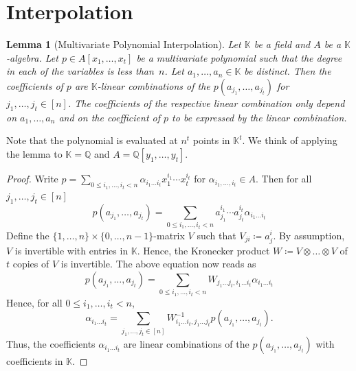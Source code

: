 \documentclass[11pt, DIV=15]{scrarticle}
\theoremstyle{definition}
\theoremstyle{plain}
\newtheorem{lemma}[definition]{Lemma}
\theoremstyle{remark}
\begin{document}
	
	
	\section{Interpolation}
	
	\begin{lemma}[Multivariate Polynomial Interpolation] \label{lem:multivariate-polynomial-interpolation}
		Let $\mathbb{K}$ be a field and $A$ be a $\mathbb{K}$-algebra.
		Let $p \in A[x_1, \dots, x_t]$ be a multivariate polynomial such that the degree in each of the variables is less than~$n$.
		Let $a_1, \dots, a_n \in \mathbb{K}$ be distinct.
		Then the coefficients of $p$ are $\mathbb{K}$-linear combinations of the $p(a_{j_1}, \dots, a_{j_t})$ for $j_1, \dots, j_t \in [n]$. The coefficients of the respective linear combination only depend on $a_1, \dots, a_n$ and on the coefficient of $p$ to be expressed by the linear combination.
	\end{lemma}
	
	Note that the polynomial is evaluated at $n^t$ points in $\mathbb{K}^t$.
	We think of applying the lemma to $\mathbb{K} = \mathbb{Q}$ and $A = \mathbb{Q}[y_1,\dots, y_t]$.
	
	\begin{proof}
		Write $p = \sum_{0 \leq i_1,\dots, i_t < n} \alpha_{i_1\dots i_t} x^{i_1}_1 \cdots x^{i_t}_t$ 
		for $\alpha_{i_1,\dots, i_t} \in A$.
		Then for all $j_1, \dots, j_t \in [n]$
		\[
		p(a_{j_1}, \dots, a_{j_t}) = \sum_{0 \leq i_1,\dots, i_t < n}  a^{i_1}_{j_1} \cdots a^{i_t}_{j_t} \alpha_{i_1\dots i_t}
		\]
		Define the $\{1, \dots, n\} \times \{0, \dots, n-1\}$-matrix $V$ such that $V_{ji} \coloneqq a_{j}^i$.
		By assumption, $V$ is invertible with entries in $\mathbb{K}$.
		Hence, the Kronecker product $W \coloneqq V \otimes \dots \otimes V$ of $t$ copies of $V$  is invertible. 
		The above equation now reads as
		\[
		p(a_{j_1}, \dots, a_{j_t}) = \sum_{0 \leq i_1,\dots, i_t < n}  W_{j_1\dots j_t, i_1\dots i_t} \alpha_{i_1\dots i_t}
		\]
		Hence, for all $0 \leq i_1,\dots, i_t < n$,
		\[
		\alpha_{i_1\dots i_t} = \sum_{j_1, \dots, j_t \in [n]} W^{-1}_{i_1\dots i_t, j_1\dots j_t} p(a_{j_1}, \dots, a_{j_t}).
		\]
		Thus, the coefficients $\alpha_{i_1\dots i_t}$ are linear combinations of the $p(a_{j_1}, \dots, a_{j_t})$ with coefficients in $\mathbb{K}$.
	\end{proof}
	
\end{document}
